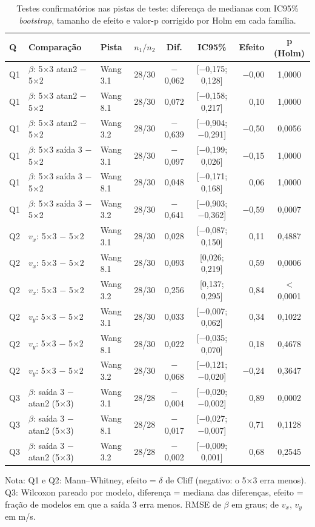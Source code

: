 \begin{table}[htbp]
    \centering
    \caption{Testes confirmatórios nas pistas de teste: diferença de medianas com IC95\% \textit{bootstrap}, tamanho de efeito e valor-p corrigido por Holm em cada família.}
    \label{tab:testes}
    \scriptsize
    \begin{tabular}{lllcccrc}
        \toprule
        \textbf{Q} & \textbf{Comparação} & \textbf{Pista} & $n_1/n_2$ & \textbf{Dif.} & \textbf{IC95\%} & \textbf{Efeito} & \textbf{p (Holm)} \\
        \midrule
        Q1 & $\beta$: 5×3 atan2 $-$ 5×2 & Wang 3.1 & 28/30 & $-$0,062 & [$-$0,175; 0,128] & $-$0,00 & 1,0000 \\
        Q1 & $\beta$: 5×3 atan2 $-$ 5×2 & Wang 8.1 & 28/30 & 0,072 & [$-$0,158; 0,217] & 0,10 & 1,0000 \\
        Q1 & $\beta$: 5×3 atan2 $-$ 5×2 & Wang 3.2 & 28/30 & $-$0,639 & [$-$0,904; $-$0,291] & $-$0,50 & 0,0056 \\
        Q1 & $\beta$: 5×3 saída 3 $-$ 5×2 & Wang 3.1 & 28/30 & $-$0,097 & [$-$0,199; 0,026] & $-$0,15 & 1,0000 \\
        Q1 & $\beta$: 5×3 saída 3 $-$ 5×2 & Wang 8.1 & 28/30 & 0,048 & [$-$0,171; 0,168] & 0,06 & 1,0000 \\
        Q1 & $\beta$: 5×3 saída 3 $-$ 5×2 & Wang 3.2 & 28/30 & $-$0,641 & [$-$0,903; $-$0,362] & $-$0,59 & 0,0007 \\
        Q2 & $v_x$: 5×3 $-$ 5×2 & Wang 3.1 & 28/30 & 0,028 & [$-$0,087; 0,150] & 0,11 & 0,4887 \\
        Q2 & $v_x$: 5×3 $-$ 5×2 & Wang 8.1 & 28/30 & 0,093 & [0,026; 0,219] & 0,59 & 0,0006 \\
        Q2 & $v_x$: 5×3 $-$ 5×2 & Wang 3.2 & 28/30 & 0,256 & [0,137; 0,295] & 0,84 & $<$0,0001 \\
        Q2 & $v_y$: 5×3 $-$ 5×2 & Wang 3.1 & 28/30 & 0,033 & [$-$0,007; 0,062] & 0,34 & 0,1022 \\
        Q2 & $v_y$: 5×3 $-$ 5×2 & Wang 8.1 & 28/30 & 0,022 & [$-$0,035; 0,070] & 0,18 & 0,4678 \\
        Q2 & $v_y$: 5×3 $-$ 5×2 & Wang 3.2 & 28/30 & $-$0,068 & [$-$0,121; $-$0,020] & $-$0,24 & 0,3647 \\
        Q3 & $\beta$: saída 3 $-$ atan2 (5×3) & Wang 3.1 & 28/28 & $-$0,004 & [$-$0,020; $-$0,002] & 0,89 & 0,0002 \\
        Q3 & $\beta$: saída 3 $-$ atan2 (5×3) & Wang 8.1 & 28/28 & $-$0,017 & [$-$0,027; $-$0,007] & 0,71 & 0,1128 \\
        Q3 & $\beta$: saída 3 $-$ atan2 (5×3) & Wang 3.2 & 28/28 & $-$0,002 & [$-$0,009; 0,001] & 0,68 & 0,2545 \\
        \bottomrule
    \end{tabular}
    \par\footnotesize Nota: Q1 e Q2: Mann--Whitney, efeito = $\delta$ de Cliff (negativo: o 5×3 erra menos). Q3: Wilcoxon pareado por modelo, diferença = mediana das diferenças, efeito = fração de modelos em que a saída 3 erra menos. RMSE de $\beta$ em graus; de $v_x$, $v_y$ em m/s.
\end{table}
